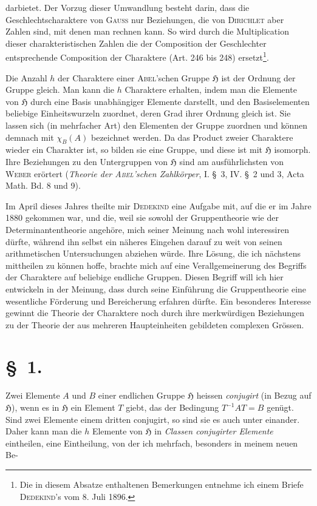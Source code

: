 \documentclass[11pt]{article}
\newcommand{\grp}{\mathfrak{H}}
\begin{document}
darbietet. Der Vorzug dieser Umwandlung besteht darin, dass die Geschlechtscharaktere von \textsc{Gauss} nur Beziehungen, die von \textsc{Dirichlet} aber Zahlen sind, mit denen man rechnen kann. So wird durch die Multiplication dieser charakteristischen Zahlen die der Composition der Geschlechter entsprechende Composition der Charaktere (Art. 246 bis 248) ersetzt\footnote{Die in diesem Absatze enthaltenen Bemerkungen entnehme ich einem Briefe \textsc{Dedekind}'s vom 8. Juli 1896.}.

Die Anzahl $h$ der Charaktere einer \textsc{Abel}'schen Gruppe $\grp$ ist der Ordnung der Gruppe gleich. Man kann die $h$ Charaktere erhalten, indem man die Elemente von $\grp$ durch eine Basis unabhängiger Elemente darstellt, und den Basiselementen beliebige Einheitswurzeln zuordnet, deren Grad ihrer Ordnung gleich ist. Sie lassen sich (in mehrfacher Art) den Elementen der Gruppe zuordnen und können demnach mit $\chi_B(A)$ bezeichnet werden. Da das Product zweier Charaktere wieder ein Charakter ist, so bilden sie eine Gruppe, und diese ist mit $\grp$ isomorph. Ihre Beziehungen zu den Untergruppen von $\grp$ sind am ausführlichsten von \textsc{Weber} erörtert (\emph{Theorie der \textsc{Abel}'schen Zahlkörper}, I. \S~3, IV. \S~2 und 3, Acta Math. Bd. 8 und 9).

Im April dieses Jahres theilte mir \textsc{Dedekind} eine Aufgabe mit, auf die er im Jahre 1880 gekommen war, und die, weil sie sowohl der Gruppentheorie wie der Determinantentheorie angehöre, mich seiner Meinung nach wohl interessiren dürfte, während ihn selbst ein näheres Eingehen darauf zu weit von seinen arithmetischen Untersuchungen abziehen würde. Ihre Lösung, die ich nächstens mittheilen zu können hoffe, brachte mich auf eine Verallgemeinerung des Begriffs der Charaktere auf beliebige endliche Gruppen. Diesen Begriff will ich hier entwickeln in der Meinung, dass durch seine Einführung die Gruppentheorie eine wesentliche Förderung und Bereicherung erfahren dürfte. Ein besonderes Interesse gewinnt die Theorie der Charaktere noch durch ihre merkwürdigen Beziehungen zu der Theorie der aus mehreren Haupteinheiten gebildeten complexen Grössen.

\section*{\S~1.}

Zwei Elemente $A$ und $B$ einer endlichen Gruppe $\grp$ heissen \emph{conjugirt} (in Bezug auf $\grp$), wenn es in $\grp$ ein Element $T$ giebt, das der Bedingung $T^{-1}AT=B$ genügt. Sind zwei Elemente einem dritten conjugirt, so sind sie es auch unter einander. Daher kann man die $h$ Elemente von $\grp$ in \emph{Classen conjugirter Elemente} eintheilen, eine Eintheilung, von der ich mehrfach, besonders in meinem neuen Be-
\end{document}
